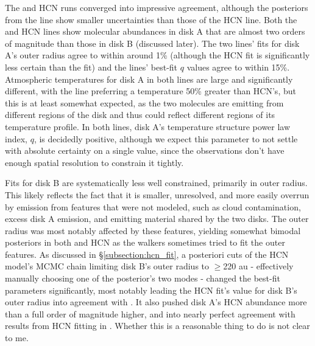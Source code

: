 The \hco and HCN runs converged into impressive agreement, although the posteriors from the \hco line show smaller uncertainties than those of the HCN line. Both the \hco and HCN lines show molecular abundances in disk A that are almost two orders of magnitude than those in disk B (discussed later). The two lines' fits for disk A's outer radius agree to within around 1\% (although the HCN fit is significantly less certain than the \hco fit) and the lines' best-fit $q$ values agree to within 15\%. Atmospheric temperatures for disk A in both lines are large and significantly different, with the \hco line preferring a temperature 50\% greater than HCN's, but this is at least somewhat expected, as the two molecules are emitting from different regions of the disk and thus could reflect different regions of its temperature profile. In both lines, disk A's temperature structure power law index, $q$, is decidedly positive, although we expect this parameter to not settle with absolute certainty on a single value, since the observations don't have enough spatial resolution to constrain it tightly.


Fits for disk B are systematically less well constrained, primarily in outer radius. This likely reflects the fact that it is smaller, unresolved, and more easily overrun by emission from features that were not modeled, such as cloud contamination, excess disk A emission, and emitting material shared by the two disks. The outer radius was most notably affected by these features, yielding somewhat bimodal posteriors in both \hco and HCN as the walkers sometimes tried to fit the outer features. As discussed in \S\ref{subsection:hcn_fit}, a posteriori cuts of the HCN model's MCMC chain limiting disk B's outer radius to $\geq$220 au - effectively manually choosing one of the posterior's two modes -  changed the best-fit parameters significantly, most notably leading the HCN fit's value for disk B's outer radius into agreement with \hco. It also pushed disk A's HCN abundance more than a full order of magnitude higher, and into nearly perfect agreement with results from HCN fitting in \citet{Factor2017}. Whether this is a reasonable thing to do is not clear to me.



